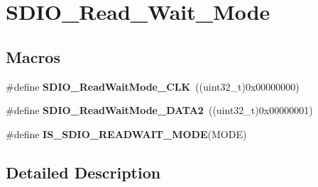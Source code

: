 \hypertarget{group___s_d_i_o___read___wait___mode}{\section{S\-D\-I\-O\-\_\-\-Read\-\_\-\-Wait\-\_\-\-Mode}
\label{group___s_d_i_o___read___wait___mode}
}
\subsection*{Macros}
\begin{DoxyCompactItemize}
\item 
\hypertarget{group___s_d_i_o___read___wait___mode_ga5d73b50fed8b2589f337a6301f22f41c}{\#define {\bfseries S\-D\-I\-O\-\_\-\-Read\-Wait\-Mode\-\_\-\-C\-L\-K}~((uint32\-\_\-t)0x00000000)}\label{group___s_d_i_o___read___wait___mode_ga5d73b50fed8b2589f337a6301f22f41c}

\item 
\hypertarget{group___s_d_i_o___read___wait___mode_ga3d6952d82468b49dcc7abd5b9e02039f}{\#define {\bfseries S\-D\-I\-O\-\_\-\-Read\-Wait\-Mode\-\_\-\-D\-A\-T\-A2}~((uint32\-\_\-t)0x00000001)}\label{group___s_d_i_o___read___wait___mode_ga3d6952d82468b49dcc7abd5b9e02039f}

\item 
\#define {\bfseries I\-S\-\_\-\-S\-D\-I\-O\-\_\-\-R\-E\-A\-D\-W\-A\-I\-T\-\_\-\-M\-O\-D\-E}(M\-O\-D\-E)
\end{DoxyCompactItemize}


\subsection{Detailed Description}


